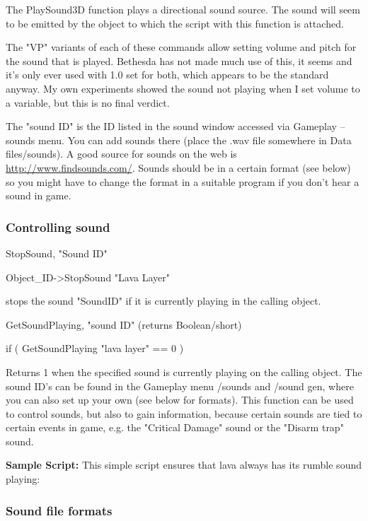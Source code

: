 \documentclass[
]{article}
\begin{document}
The PlaySound3D function plays a directional sound source. The sound
will seem to be emitted by the object to which the script with this
function is attached.

The "VP" variants of each of these commands allow setting volume and
pitch for the sound that is played. Bethesda has not made much use of
this, it seems and it's only ever used with 1.0 set for both, which
appears to be the standard anyway. My own experiments showed the sound
not playing when I set volume to a variable, but this is no final
verdict.

The "sound ID" is the ID listed in the sound window accessed via
Gameplay -- sounds menu. You can add sounds there (place the .wav file
somewhere in Data files/sounds). A good source for sounds on the web is
\url{http://www.findsounds.com/}. Sounds should be in a certain format
(see below) so you might have to change the format in a suitable program
if you don't hear a sound in game.

\hypertarget{controlling-sound}{%
\subsubsection{Controlling sound}\label{controlling-sound}}

StopSound, "Sound ID"

Object\_ID-\textgreater StopSound "Lava Layer"

stops the sound "SoundID" if it is currently playing in the calling
object.

GetSoundPlaying, "sound ID" (returns Boolean/short)

if ( GetSoundPlaying "lava layer" == 0 )

Returns 1 when the specified sound is currently playing on the calling
object. The sound ID's can be found in the Gameplay menu /sounds and
/sound gen, where you can also set up your own (see below for formats).
This function can be used to control sounds, but also to gain
information, because certain sounds are tied to certain events in game,
e.g. the "Critical Damage" sound or the "Disarm trap" sound.

\textbf{Sample Script:} This simple script ensures that lava always has
its rumble sound playing:



\hypertarget{sound-file-formats}{%
\subsubsection{Sound file formats}\label{sound-file-formats}}
\end{document}
